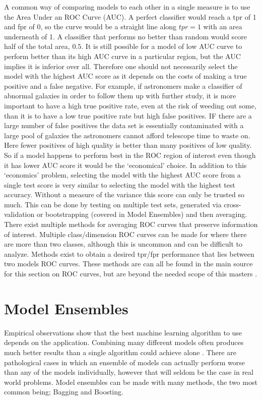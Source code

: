 A common way of comparing models to each other in a single measure is to use the Area Under an ROC Curve (AUC).
A perfect classifier would reach a tpr of 1 and fpr of 0, so the curve would be a straight line along $tpr=1$ with an area underneath of 1.
A classifier that performs no better than random would score half of the total area, $0.5$.
It is still possible for a model of low AUC curve to perform better than its high AUC curve in a particular region, but the AUC implies it is inferior over all.
Therefore one should not necessarily select the model with the highest AUC score as it depends on the costs of making a true positive and a false negative.
For example, if astronomers make a classifier of abnormal galaxies in order to follow them up with further study, it is more important to have a high true positive rate, even at the risk of weeding out some, than it is to have a low true positive rate but high false positives.
IF there are a large number of false positives the data set is essentially contaminated with a large pool of galaxies the astronomers cannot afford telescope time to waste on. 
Here fewer positives of high quality is better than many positives of low quality.
So if a model happens to perform best in the ROC region of interest even though it has lower AUC score it would be the `economical' choice.
In addition to this `economics' problem, selecting the model with the highest AUC score from a single test score is very similar to selecting the model with the highest test accuracy.
Without a measure of the variance this score can only be trusted so much.
This can be done by testing on multiple test sets, generated via cross-validation or bootstrapping (covered in Model Ensembles) and then averaging.
There exist multiple methods for averaging ROC curves that preserve information of interest.
Multiple class/dimension ROC curves can be made for where there are more than two classes, although this is uncommon and can be difficult to analyze.
Methods exist to obtain a desired tpr/fpr performance that lies between two models ROC curves.
These methods are can all be found in the main source for this section \citep{fawcett2006introduction} on ROC curves, but are beyond the needed scope of this masters  .

\section{Model Ensembles}

Empirical observations show that the best machine learning algorithm to use depends on the application\citep{domingos2012few}.
Combining many different models often produces much better results than a single algorithm could achieve alone \citep{witten2005data}.
There are pathological cases in which an ensemble of models can actually perform worse than any of the models individually, however that will seldom be the case in real world problems.
Model ensembles can be made with many methods, the two most common being; Bagging and Boosting.

